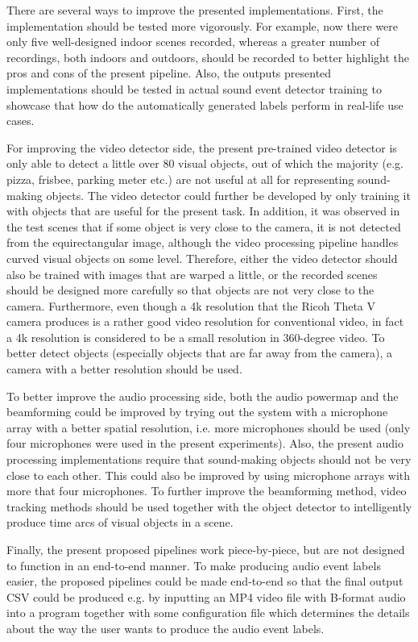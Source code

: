 There are several ways to improve the presented implementations. First, the implementation should be tested more vigorously. For example, now there were only five well-designed indoor scenes recorded, whereas a greater number of recordings, both indoors and outdoors, should be recorded to better highlight the pros and cons of the present pipeline. Also, the outputs presented implementations should be tested in actual sound event detector training to showcase that how do the automatically generated labels perform in real-life use cases.

For improving the video detector side, the present pre-trained video detector is only able to detect a little over 80 visual objects, out of which the majority (e.g. pizza, frisbee, parking meter etc.) are not useful at all for representing sound-making objects. The video detector could further be developed by only training it with objects that are useful for the present task. In addition, it was observed in the test scenes that if some object is very close to the camera, it is not detected from the equirectangular image, although the video processing pipeline handles curved visual objects on some level. Therefore, either the video detector should also be trained with images that are warped a little, or the recorded scenes should be designed more carefully so that objects are not very close to the camera. Furthermore, even though a 4k resolution that the Ricoh Theta V camera produces is a rather good video resolution for conventional video, in fact a 4k resolution is considered to be a small resolution in 360-degree video. To better detect objects (especially objects that are far away from the camera), a camera with a better resolution should be used.

To better improve the audio processing side, both the audio powermap and the beamforming could be improved by trying out the system with a microphone array with a better spatial resolution, i.e. more microphones should be used (only four microphones were used in the present experiments). Also, the present audio processing implementations require that sound-making objects should not be very close to each other. This could also be improved by using microphone arrays with more that four microphones. To further improve the beamforming method, video tracking methods should be used together with the object detector to intelligently produce time arcs of visual objects in a scene.

Finally, the present proposed pipelines work piece-by-piece, but are not designed to function in an end-to-end manner. To make producing audio event labels easier, the proposed pipelines could be made end-to-end so that the final output CSV could be produced e.g. by inputting an MP4 video file with B-format audio into a program together with some configuration file which determines the details about the way the user wants to produce the audio event labels.


